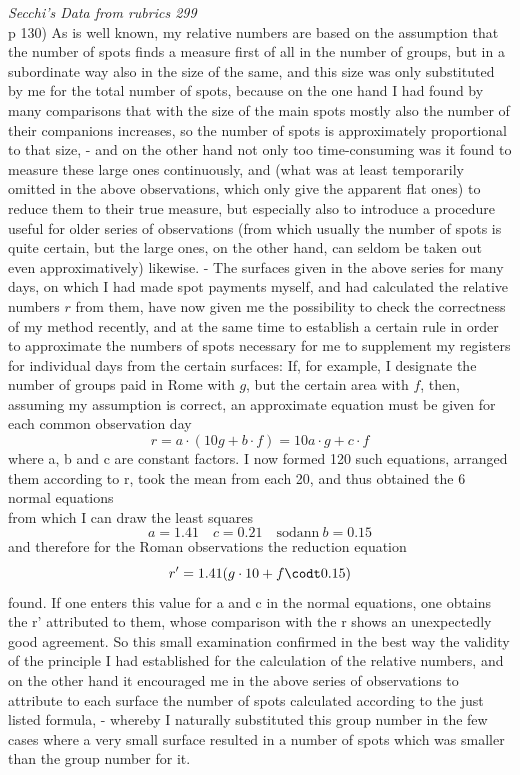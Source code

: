 \documentclass[12pt]{article}
\begin{document}
\textit{Secchi's Data from rubrics 299}\\

p 130) As is well known, my relative numbers are based on the assumption that the number of spots finds a measure first of all in the number of groups, but in a subordinate way also in the size of the same, and this size was only substituted by me for the total number of spots, because on the one hand I had found by many comparisons that with the size of the main spots mostly also the number of their companions increases, so the number of spots is approximately proportional to that size, - and on the other hand not only too time-consuming was it found to measure these large ones continuously, and (what was at least temporarily omitted in the above observations, which only give the apparent flat ones) to reduce them to their true measure, but especially also to introduce a procedure useful for older series of observations (from which usually the number of spots is quite certain, but the large ones, on the other hand, can seldom be taken out even approximatively) likewise. - The surfaces given in the above series for many days, on which I had made spot payments myself, and had calculated the relative numbers $r$ from them, have now given me the possibility to check the correctness of my method recently, and at the same time to establish a certain rule in order to approximate the numbers of spots necessary for me to supplement my registers for individual days from the certain surfaces: If, for example, I designate the number of groups paid in Rome with $g$, but the certain area with $f$, then, assuming my assumption is correct, an approximate equation must be given for each common observation day
$$r = a\cdot (10 g + b \cdot f) = 10 a \cdot g + c \cdot f$$
where a, b and c are constant factors. I now formed 120 such equations, arranged them according to r, took the mean from each 20, and thus obtained the 6 normal equations \\


from which I can draw the least squares 
$$a=1.41 \quad c=0.21 \quad \text{sodann}\ b=0.15$$
and therefore for the Roman observations the reduction equation
$$r' = 1.41(g\cdot 10 + f\codt 0.15)$$
found. If one enters this value for a and c in the normal equations, one obtains the r' attributed to them, whose comparison with the r shows an unexpectedly good agreement. So this small examination confirmed in the best way the validity of the principle I had established for the calculation of the relative numbers, and on the other hand it encouraged me in the above series of observations to attribute to each surface the number of spots calculated according to the just listed formula, - whereby I naturally substituted this group number in the few cases where a very small surface resulted in a number of spots which was smaller than the group number for it.
\end{document}
